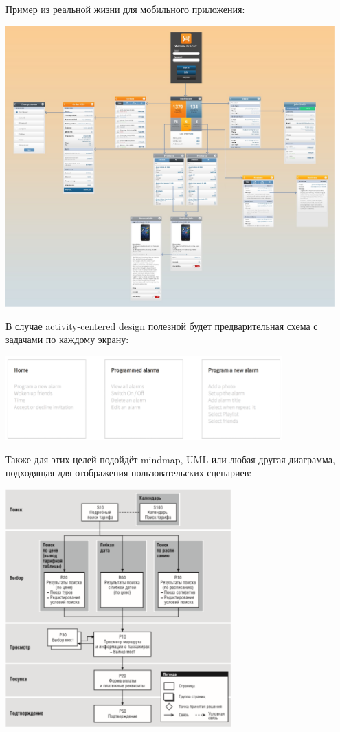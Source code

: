 \documentclass{../../text-style}
\begin{document}
Пример из реальной жизни для мобильного приложения:

\begin{center}
    \includegraphics[width=0.95\textwidth]{screenMap.png}
\end{center}

В случае activity-centered design полезной будет предварительная схема с задачами по каждому экрану:

\begin{center}
    \includegraphics[width=0.8\textwidth]{screenTasks.png}
\end{center}

Также для этих целей подойдёт mindmap, UML или любая другая диаграмма, подходящая для отображения пользовательских сценариев:

\begin{center}
    \includegraphics[width=0.65\textwidth]{userScenario.png}
\end{center}
\end{document}
